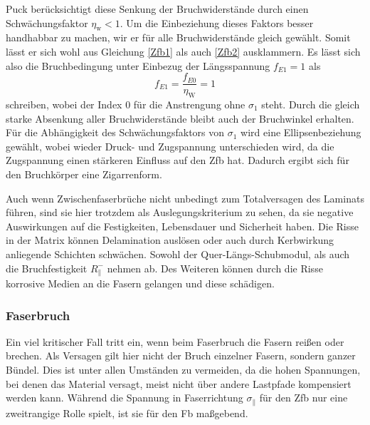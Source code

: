Puck berücksichtigt diese Senkung der Bruchwiderstände durch einen Schwächungsfaktor $\eta_\mathrm{w} < 1$. Um die Einbeziehung dieses Faktors besser handhabbar zu machen, wir er für alle Bruchwiderstände gleich gewählt. Somit lässt er sich wohl aus Gleichung \ref{Zfb1} als auch \ref{Zfb2} ausklammern. Es lässt sich also die Bruchbedingung unter Einbezug der Längsspannung $f_{E1} = 1$ als
\begin{equation}
	f_{E1} = \frac{f_{E0}}{\eta_\mathrm{W}} = 1
\end{equation}
schreiben, wobei der Index 0 für die Anstrengung ohne $\sigma_1$ steht. Durch die gleich starke Absenkung aller Bruchwiderstände bleibt auch der Bruchwinkel erhalten. Für die Abhängigkeit des Schwächungsfaktors von $\sigma_1$ wird eine Ellipsenbeziehung gewählt, wobei wieder Druck- und Zugspannung unterschieden wird, da die Zugspannung einen stärkeren Einfluss auf den Zfb hat. Dadurch ergibt sich für den Bruchkörper eine Zigarrenform.

Auch wenn Zwischenfaserbrüche nicht unbedingt zum Totalversagen des Laminats führen, sind sie hier trotzdem als Auslegungskriterium zu sehen, da sie negative Auswirkungen auf die Festigkeiten, Lebensdauer und Sicherheit haben. Die Risse in der Matrix können Delamination auslösen oder auch durch Kerbwirkung anliegende Schichten schwächen. Sowohl der Quer-Längs-Schubmodul, als auch die Bruchfestigkeit $R_\parallel^-$ nehmen ab. Des Weiteren können durch die Risse korrosive Medien an die Fasern gelangen und diese schädigen.
\subsubsection{Faserbruch}
Ein viel kritischer Fall tritt ein, wenn beim Faserbruch die Fasern reißen oder brechen. Als Versagen gilt hier nicht der Bruch einzelner Fasern, sondern ganzer Bündel. Dies ist unter allen Umständen zu vermeiden, da die hohen Spannungen, bei denen das Material versagt, meist nicht über andere Lastpfade kompensiert werden kann. Während die Spannung in Faserrichtung $\sigma_{\parallel}$ für den Zfb nur eine zweitrangige Rolle spielt, ist sie für den Fb maßgebend.

